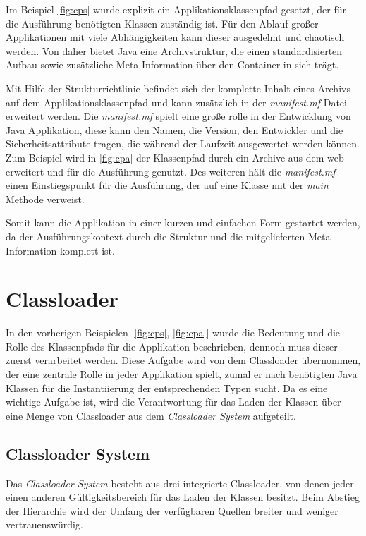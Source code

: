   Im Beispiel \ref{fig:cps} wurde explizit ein Applikationsklassenpfad gesetzt, der für die Ausführung benötigten Klassen zuständig ist. Für den Ablauf großer Applikationen mit viele Abhängigkeiten kann dieser ausgedehnt und chaotisch werden. Von daher bietet Java eine Archivstruktur, die einen standardisierten Aufbau sowie zusätzliche Meta-Information über den Container in sich trägt. 
  
  Mit Hilfe der Strukturrichtlinie befindet sich der komplette Inhalt eines Archivs auf dem Applikationsklassenpfad und kann zusätzlich in der \textit{manifest.mf} Datei erweitert werden. Die \textit{manifest.mf} spielt eine große rolle in der Entwicklung von Java Applikation, diese kann den Namen, die Version, den Entwickler und die Sicherheitsattribute tragen, die während der Laufzeit ausgewertet werden können. Zum Beispiel wird in \ref{fig:cpa} der Klassenpfad durch ein Archive aus dem web erweitert und für die Ausführung genutzt. Des weiteren hält die \textit{manifest.mf} einen Einstiegspunkt für die Ausführung, der auf eine Klasse mit der \textit{main} Methode verweist.
  

  Somit kann die Applikation in einer kurzen und einfachen Form gestartet werden, da der Ausführungskontext durch die Struktur und die mitgelieferten Meta-Information komplett ist.


\section{Classloader}\label{sec:cl}

  In den vorherigen Beispielen [\ref{fig:cps}, \ref{fig:cpa}] wurde die Bedeutung und die Rolle des Klassenpfads für die Applikation beschrieben, dennoch muss dieser zuerst verarbeitet werden. Diese Aufgabe wird von dem Classloader übernommen, der eine zentrale Rolle in jeder Applikation spielt, zumal er nach benötigten Java Klassen für die Instantiierung der entsprechenden Typen sucht. Da es eine wichtige Aufgabe ist, wird die Verantwortung für das Laden der Klassen über eine Menge von Classloader aus dem \textit{Classloader System} aufgeteilt. 


  \subsection{Classloader System} \label{sec:cls}

    Das \textit{Classloader System} besteht aus drei integrierte Classloader, von denen jeder einen anderen Gültigkeitsbereich für das Laden der Klassen besitzt. Beim Abstieg der Hierarchie wird der Umfang der verfügbaren Quellen breiter und weniger vertrauenswürdig. 

